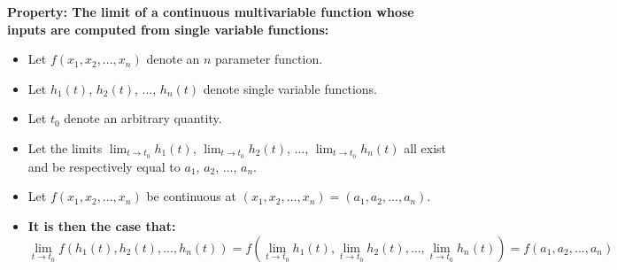 \documentclass{article}
\begin{document}
\vspace{5mm}

\textbf{Property: The limit of a continuous multivariable function whose inputs are computed from single variable functions:}
\begin{itemize}
\item Let \(f(x_1, x_2, ..., x_n)\) denote an \(n\) parameter function. 
\item Let \(h_1(t)\), \(h_2(t)\), ..., \(h_n(t)\) denote single variable functions. 
\item Let \(t_0\) denote an arbitrary quantity. 
\item Let the limits \(\lim_{t \rightarrow t_0} h_1(t)\), \(\lim_{t \rightarrow t_0} h_2(t)\), ..., \(\lim_{t \rightarrow t_0} h_n(t)\) all exist and be respectively equal to \(a_1\), \(a_2\), ..., \(a_n\). 
\item Let \(f(x_1, x_2, ..., x_n)\) be continuous at \((x_1, x_2, ..., x_n) = (a_1, a_2, ..., a_n)\). 
\item {\bf It is then the case that:}
\[\lim_{t \rightarrow t_0} f(h_1(t), h_2(t), ..., h_n(t)) = f\left(\lim_{t \rightarrow t_0} h_1(t), \lim_{t \rightarrow t_0} h_2(t), ..., \lim_{t \rightarrow t_0} h_n(t)\right) = f(a_1, a_2, ..., a_n)\] 
\end{itemize}

\vspace{5mm}
\end{document}
